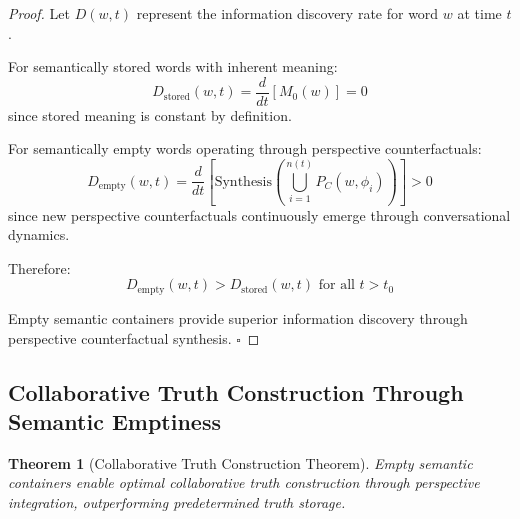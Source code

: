 \documentclass[11pt,a4paper]{article}
\newtheorem{theorem}{Theorem}[section]
\begin{document}
\begin{proof}
Let $D(w,t)$ represent the information discovery rate for word $w$ at time $t$.

For semantically stored words with inherent meaning:
\begin{equation}
D_{\text{stored}}(w,t) = \frac{d}{dt}[M_0(w)] = 0
\end{equation}
since stored meaning is constant by definition.

For semantically empty words operating through perspective counterfactuals:
\begin{equation}
D_{\text{empty}}(w,t) = \frac{d}{dt}\left[\text{Synthesis}\left(\bigcup_{i=1}^{n(t)} P_C(w,\phi_i)\right)\right] > 0
\end{equation}
since new perspective counterfactuals continuously emerge through conversational dynamics.

Therefore:
\begin{equation}
D_{\text{empty}}(w,t) > D_{\text{stored}}(w,t) \text{ for all } t > t_0
\end{equation}

Empty semantic containers provide superior information discovery through perspective counterfactual synthesis. $\square$
\end{proof}

\subsection{Collaborative Truth Construction Through Semantic Emptiness}

\begin{theorem}[Collaborative Truth Construction Theorem]
Empty semantic containers enable optimal collaborative truth construction through perspective integration, outperforming predetermined truth storage.
\end{theorem}
\end{document}
